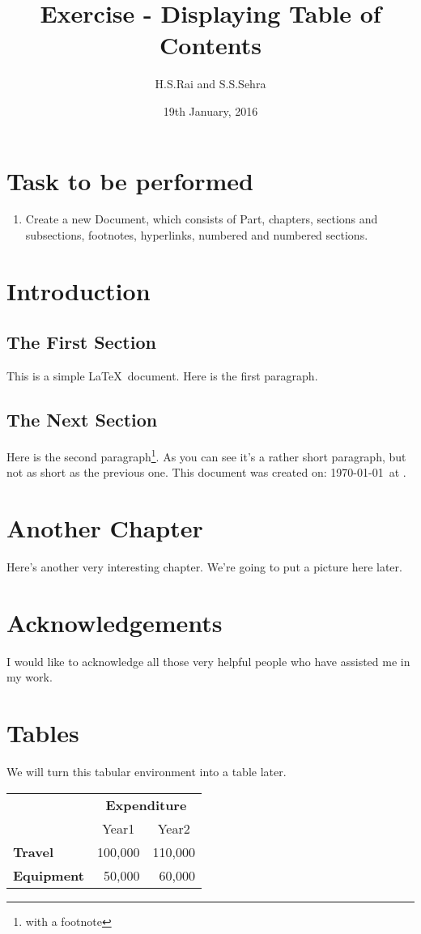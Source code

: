 \documentclass[12pt]{book}
\title{Exercise  -  Displaying Table of Contents}
\author{H.S.Rai and S.S.Sehra}
\date{19th January, 2016}
\begin{document}
\maketitle

\tableofcontents


\chapter{Task to be performed}
\begin{enumerate}
	\item Create a new Document, which consists of Part, chapters, sections and subsections, footnotes, hyperlinks, numbered and numbered sections.
\end{enumerate}

\chapter{Introduction}

\section{The First Section}

This is a simple \LaTeX\ document.
Here is the first paragraph.

\section{The Next Section}

Here is the second paragraph\footnote{with a footnote}. 
As you can see it's a rather short paragraph, but not 
as short as the previous one. This document was 
created on: \today\ at \currenttime.

\chapter{Another Chapter}

Here's another very interesting chapter.
We're going to put a picture here later.

\chapter*{Acknowledgements}

I would like to acknowledge all those
very helpful people who have assisted
me in my work.

\appendix
\chapter{Tables}

We will turn this tabular environment into a table later.

\begin{tabular}{lrr}
 & \multicolumn{2}{c}{\bfseries Expenditure}\\
 & \multicolumn{1}{c}{Year1} & \multicolumn{1}{c}{Year2}\\
\bfseries Travel & 100,000 & 110,000\\
\bfseries Equipment & 50,000 & 60,000
\end{tabular}
\end{document}
